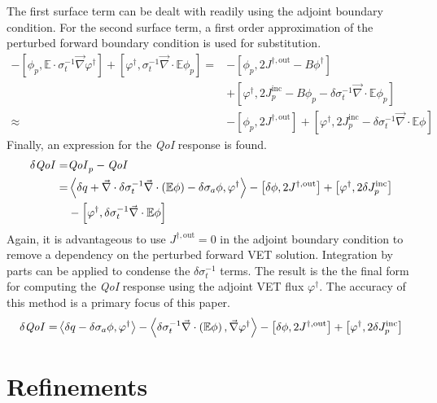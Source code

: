 \documentclass[12pt]{report}
\newcommand{\bra}{\left\langle}
\newcommand{\ket}{\right\rangle}
\newcommand{\sbra}{\left[}
\newcommand{\sket}{\right]}
\renewcommand{\div}{\vec{\nabla} \cdot}
\newcommand{\grad}{\vec{\nabla}}
\newcommand{\vefadj}{\varphi^\dag}
\newcommand{\Edd}{\mathbb{E}}
\newcommand{\siga}{\sigma_a}
\newcommand{\isigt}{\sigma_t^{-1}}
\newcommand{\scalSource}{q}
\newcommand{\qoi}{{\it QoI}\xspace}
\begin{document}
The first surface term can be dealt with readily using the adjoint boundary condition. For the second surface term, a first order approximation of the perturbed forward boundary condition is used for substitution.
\begin{equation}
\begin{split}
 - \sbra \phi_p, \Edd \cdot \isigt \grad \vefadj \sket  + \sbra \vefadj, \isigt \div \Edd \phi_p \sket 
=&- \sbra \phi_p, 2J^{\dag,\text{out}} - B \phi^\dag \sket \\ &+ \sbra \vefadj, 2 J_p^{\text{inc}} - B \phi_p - \delta \isigt \div \Edd \phi_p \sket \\
\approx&- \sbra \phi_p, 2J^{\dag,\text{out}} \sket + \sbra \vefadj, 2 J_p^{\text{inc}} - \delta \isigt \div \Edd \phi \sket 
\end{split}
\end{equation}
Finally, an expression for the \qoi response is found.
\begin{equation}
\label{QoIVETAdjlong}
\begin{split}
\delta \qoi =& \qoi_p - \qoi \\ 
=& \bra \delta \scalSource + \div \delta \isigt \div \left( \Edd \phi \right)  - \delta \siga \phi, \vefadj \ket 
- \sbra \delta \phi, 2J^{\dag,\text{out}} \sket + \sbra \vefadj, 2 \delta J_p^{\text{inc}} \sket \\
& - \sbra \vefadj, \delta \isigt \div \Edd \phi \sket 
\end{split}
\end{equation}
Again, it is advantageous to use $J^{\dag,\text{out}}=0$ in the adjoint boundary condition to remove a dependency on the 
perturbed forward VET solution. Integration by parts can be applied to condense the $\delta \isigt$ terms. The result is the the final form for computing the \qoi response using the adjoint VET flux $\vefadj$. The accuracy of this method is a primary focus of this paper.
\begin{equation}
\label{VETsens}
\begin{split}
\delta \qoi =&  \bra \delta \scalSource - \delta \siga \phi, \vefadj \ket  - \bra \delta \isigt \div \left( \Edd \phi \right) , \grad \vefadj \ket
- \sbra \delta \phi, 2J^{\dag,\text{out}} \sket + \sbra \vefadj, 2 \delta J_p^{\text{inc}} \sket \\
\end{split}
\end{equation}



\section{Refinements}
\end{document}
